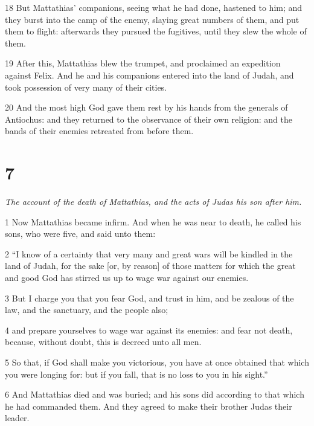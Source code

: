 \par 18 But Mattathias’ companions, seeing what he had done, hastened to him; and they burst into the camp of the enemy, slaying great numbers of them, and put them to flight: afterwards they pursued the fugitives, until they slew the whole of them. 

\par 19 After this, Mattathias blew the trumpet, and proclaimed an expedition against Felix. And he and his companions entered into the land of Judah, and took possession of very many of their cities. 

\par 20 And the most high God gave them rest by his hands from the generals of Antiochus: and they returned to the observance of their own religion: and the bands of their enemies retreated from before them. 

\chapter{7}

\par \textit{The account of the death of Mattathias, and the acts of Judas his son after him.}

\par 1 Now Mattathias became infirm. And when he was near to death, he called his sons, who were five, and said unto them: 

\par 2 “I know of a certainty that very many and great wars will be kindled in the land of Judah, for the sake [or, by reason] of those matters for which the great and good God has stirred us up to wage war against our enemies. 

\par 3 But I charge you that you fear God, and trust in him, and be zealous of the law, and the sanctuary, and the people also; 

\par 4 and prepare yourselves to wage war against its enemies: and fear not death, because, without doubt, this is decreed unto all men. 

\par 5 So that, if God shall make you victorious, you have at once obtained that which you were longing for: but if you fall, that is no loss to you in his sight.” 

\par 6 And Mattathias died and was buried; and his sons did according to that which he had commanded them. And they agreed to make their brother Judas their leader. 

